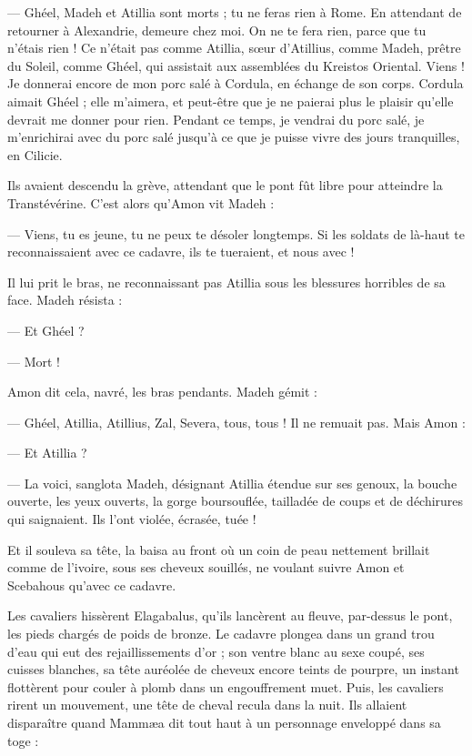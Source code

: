 \documentclass[a4paper, 11pt, oneside, polutonikogreek, french]{article}
\begin{document}
--- Ghéel, Madeh et Atillia sont morts ; tu ne feras rien à Rome. En attendant de retourner à Alexandrie, demeure chez moi. On ne te fera rien, parce que tu n'étais rien ! Ce n'était pas comme Atillia, sœur d'Atillius, comme Madeh, prêtre du Soleil, comme Ghéel, qui assistait aux assemblées du Kreistos Oriental. Viens ! Je donnerai encore de mon porc salé à Cordula, en échange de son corps. Cordula aimait Ghéel ; elle m'aimera, et peut-être que je ne paierai plus le plaisir qu'elle devrait me donner pour rien. Pendant ce temps, je vendrai du porc salé, je m'enrichirai avec du porc salé jusqu'à ce que je puisse vivre des jours tranquilles, en Cilicie.

Ils avaient descendu la grève, attendant que le pont fût libre pour atteindre la Transtévérine. C'est alors qu'Amon vit Madeh :

--- Viens, tu es jeune, tu ne peux te désoler longtemps. Si les soldats de là-haut te reconnaissaient avec ce cadavre, ils te tueraient, et nous avec !

Il lui prit le bras, ne reconnaissant pas Atillia sous les blessures horribles de sa face. Madeh résista :

--- Et Ghéel ?

--- Mort !

Amon dit cela, navré, les bras pendants. Madeh gémit :

--- Ghéel, Atillia, Atillius, Zal, Severa, tous, tous ! Il ne remuait pas. Mais Amon :

--- Et Atillia ?

--- La voici, sanglota Madeh, désignant Atillia étendue sur ses genoux, la bouche ouverte, les yeux ouverts, la gorge boursouflée, tailladée de coups et de déchirures qui saignaient. Ils l'ont violée, écrasée, tuée !

Et il souleva sa tête, la baisa au front où un coin de peau nettement brillait comme de l'ivoire, sous ses cheveux souillés, ne voulant suivre Amon et Scebahous qu'avec ce cadavre.

Les cavaliers hissèrent Elagabalus, qu'ils lancèrent au fleuve, par-dessus le pont, les pieds chargés de poids de bronze. Le cadavre plongea dans un grand trou d'eau qui eut des rejaillissements d'or ; son ventre blanc au sexe coupé, ses cuisses blanches, sa tête auréolée de cheveux encore teints de pourpre, un instant flottèrent pour couler à plomb dans un engouffrement muet. Puis, les cavaliers rirent un mouvement, une tête de cheval recula dans la nuit. Ils allaient disparaître quand Mammæa dit tout haut à un personnage enveloppé dans sa toge :
\end{document}
